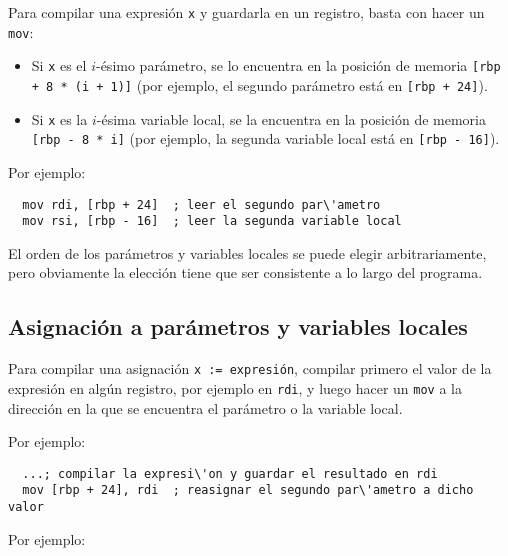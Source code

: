 \documentclass{article}
\begin{document}
Para compilar una expresi\'on \texttt{x} y guardarla
en un registro, basta con hacer un \texttt{mov}:
\begin{itemize}
\item
  Si \texttt{x} es el $i$-\'esimo par\'ametro,
  se lo encuentra en la posici\'on de memoria
  \texttt{[rbp + 8 * (i + 1)]} (por ejemplo, el segundo
  par\'ametro est\'a en \texttt{[rbp + 24]}).
\item
  Si \texttt{x} es la $i$-\'esima variable local,
  se la encuentra en la posici\'on de memoria
  \texttt{[rbp - 8 * i]} (por ejemplo, la segunda
  variable local est\'a en \texttt{[rbp - 16]}).
\end{itemize}
Por ejemplo:
\begin{lstlisting}
  mov rdi, [rbp + 24]  ; leer el segundo par\'ametro
  mov rsi, [rbp - 16]  ; leer la segunda variable local
\end{lstlisting}
El orden de los par\'ametros y variables locales se
puede elegir arbitrariamente, pero obviamente la elecci\'on
tiene que ser consistente a lo largo del programa.

\subsection{Asignaci\'on a par\'ametros y variables locales}

Para compilar una asignaci\'on \texttt{x := expresi\'on},
compilar primero el valor de la expresi\'on en alg\'un registro,
por ejemplo en \texttt{rdi}, y luego hacer un \texttt{mov}
a la direcci\'on en la que se encuentra el par\'ametro o la
variable local.

Por ejemplo:
\begin{lstlisting}
  ...; compilar la expresi\'on y guardar el resultado en rdi
  mov [rbp + 24], rdi  ; reasignar el segundo par\'ametro a dicho valor
\end{lstlisting}

Por ejemplo:
\end{document}
